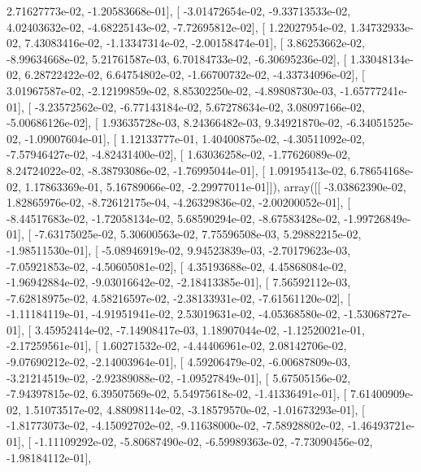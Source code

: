 \documentclass{article}
\begin{document}
          2.71627773e-02,  -1.20583668e-01],
       [ -3.01472654e-02,  -9.33713533e-02,   4.02403632e-02,
         -4.68225143e-02,  -7.72695812e-02],
       [  1.22027954e-02,   1.34732933e-02,   7.43083416e-02,
         -1.13347314e-02,  -2.00158474e-01],
       [  3.86253662e-02,  -8.99634668e-02,   5.21761587e-03,
          6.70184733e-02,  -6.30695236e-02],
       [  1.33048134e-02,   6.28722422e-02,   6.64754802e-02,
         -1.66700732e-02,  -4.33734096e-02],
       [  3.01967587e-02,  -2.12199859e-02,   8.85302250e-02,
         -4.89808730e-03,  -1.65777241e-01],
       [ -3.23572562e-02,  -6.77143184e-02,   5.67278634e-02,
          3.08097166e-02,  -5.00686126e-02],
       [  1.93635728e-03,   8.24366482e-03,   9.34921870e-02,
         -6.34051525e-02,  -1.09007604e-01],
       [  1.12133777e-01,   1.40400875e-02,  -4.30511092e-02,
         -7.57946427e-02,  -4.82431400e-02],
       [  1.63036258e-02,  -1.77626089e-02,   8.24724022e-02,
         -8.38793086e-02,  -1.76995044e-01],
       [  1.09195413e-02,   6.78654168e-02,   1.17863369e-01,
          5.16789066e-02,  -2.29977011e-01]]), array([[ -3.03862390e-02,   1.82865976e-02,  -8.72612175e-04,
         -4.26329836e-02,  -2.00200052e-01],
       [ -8.44517683e-02,  -1.72058134e-02,   5.68590294e-02,
         -8.67583428e-02,  -1.99726849e-01],
       [ -7.63175025e-02,   5.30600563e-02,   7.75596508e-03,
          5.29882215e-02,  -1.98511530e-01],
       [ -5.08946919e-02,   9.94523839e-03,  -2.70179623e-03,
         -7.05921853e-02,  -4.50605081e-02],
       [  4.35193688e-02,   4.45868084e-02,  -1.96942884e-02,
         -9.03016642e-02,  -2.18413385e-01],
       [  7.56592112e-03,  -7.62818975e-02,   4.58216597e-02,
         -2.38133931e-02,  -7.61561120e-02],
       [ -1.11184119e-01,  -4.91951941e-02,   2.53019631e-02,
         -4.05368580e-02,  -1.53068727e-01],
       [  3.45952414e-02,  -7.14908417e-03,   1.18907044e-02,
         -1.12520021e-01,  -2.17259561e-01],
       [  1.60271532e-02,  -4.44406961e-02,   2.08142706e-02,
         -9.07690212e-02,  -2.14003964e-01],
       [  4.59206479e-02,  -6.00687809e-03,  -3.21214519e-02,
         -2.92389088e-02,  -1.09527849e-01],
       [  5.67505156e-02,  -7.94397815e-02,   6.39507569e-02,
          5.54975618e-02,  -1.41336491e-01],
       [  7.61400909e-02,   1.51073517e-02,   4.88098114e-02,
         -3.18579570e-02,  -1.01673293e-01],
       [ -1.81773073e-02,  -4.15092702e-02,  -9.11638000e-02,
         -7.58928802e-02,  -1.46493721e-01],
       [ -1.11109292e-02,  -5.80687490e-02,  -6.59989363e-02,
         -7.73090456e-02,  -1.98184112e-01],
\end{document}
